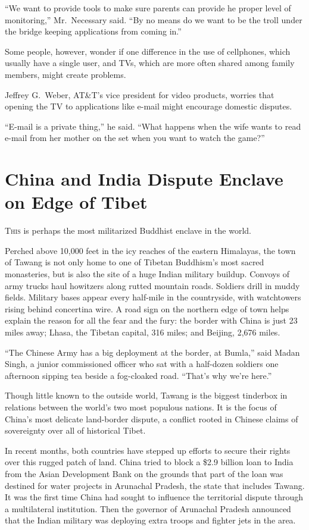 ﻿\documentclass[12pt]{article}
\begin{document}
``We want to provide tools to make sure parents can provide he proper level of monitoring,''
Mr.~Necessary said. ``By no means do we want to be the troll under the bridge keeping applications
from coming in.''

Some people, however, wonder if one difference in the use of cellphones, which usually have a single
user, and TVs, which are more often shared among family members, might create problems.

Jeffrey G.~Weber, AT\&T's vice president for video products, worries that opening the TV to
applications like e-mail might encourage domestic disputes.

``E-mail is a private thing,'' he said. ``What happens when the wife wants to read e-mail from her
mother on the set when you want to watch the game?''

\section{China and India Dispute Enclave\cite{enclave} on Edge of Tibet}

\lettrine{T}{his} is perhaps the most militarized Buddhist\cite{Buddhist} enclave in the world.

Perched above 10,000 feet in the icy reaches of the eastern Himalayas, the town of Tawang is not
only home to one of Tibetan Buddhism's most sacred monasteries, but is also the site of a huge
Indian military buildup. Convoys of army trucks haul howitzers along rutted mountain roads. Soldiers
drill in muddy fields. Military bases appear every half-mile in the countryside, with watchtowers
rising behind concertina wire. A road sign on the northern edge of town helps explain the reason for
all the fear and the fury: the border with China is just 23 miles away; Lhasa, the Tibetan capital,
316 miles; and Beijing, 2,676 miles.

``The Chinese Army has a big deployment at the border, at Bumla,'' said Madan Singh, a junior
commissioned officer who sat with a half-dozen soldiers one afternoon sipping tea beside a
fog-cloaked road. ``That's why we're here.''

Though little known to the outside world, Tawang is the biggest tinderbox in relations between the
world's two most populous nations. It is the focus of China's most delicate land-border dispute, a
conflict rooted in Chinese claims of sovereignty over all of historical Tibet.

In recent months, both countries have stepped up efforts to secure their rights over this rugged
patch of land. China tried to block a \$2.9 billion loan to India from the Asian Development Bank on
the grounds that part of the loan was destined for water projects in Arunachal Pradesh, the state
that includes Tawang. It was the first time China had sought to influence the territorial dispute
through a multilateral institution. Then the governor of Arunachal Pradesh announced that the Indian
military was deploying extra troops and fighter jets in the area.
\end{document}
